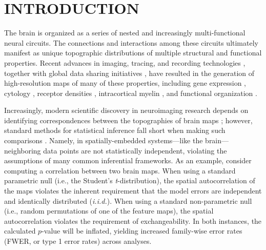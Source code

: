 \documentclass[12pt,aps,pra,reprint,showkeys]{revtex4-1}
\begin{document}
\maketitle

\section*{INTRODUCTION}

The brain is organized as a series of nested and increasingly multi-functional neural circuits.
The connections and interactions among these circuits ultimately manifest as unique topographic distributions of multiple structural and functional properties.
Recent advances in imaging, tracing, and recording technologies \citep{insel2013science}, together with global data sharing initiatives \citep{vanessen2013neuroimage, poldrack2013frontneuroinf, sudlow2015plosmed, casey2018devcogneuro}, have resulted in the generation of high-resolution maps of many of these properties, including gene expression \citep{hawrylycz2012nature, akbarian2015nature}, cytology \citep{voneconomo1925cytoarchitecture, scholtens2018neuroimage}, receptor densities \citep{beliveau2017jneuro, norgaard2020biorxiv, zilles2004janatomy, zilles2009curropneuro}, intracortical myelin \citep{burt2018natneuro, whitakervertes2016pnas}, and functional organization \citep{murray2014natneuro, yeo2011organization, shafiei2020biorxiv, margulies2016pnas, damoiseaux2006pnas, bellec2010neuroimage}.

Increasingly, modern scientific discovery in neuroimaging research depends on identifying correspondences between the topographies of brain maps \citep{baum2020pnas, vazquezrodriguez2019pnas, wang2019sciadvances, shafiei2020biorxiv, gao2020biorxiv, demirtas2019neuron, hansen2020biorxiv}; however, standard methods for statistical inference fall short when making such comparisons \citep{alexander2013convergence, alexanderbloch2018neuroimage, burt2020neuroimage, fulcher2020biorxiv}.
Namely, in spatially-embedded systems---like the brain---neighboring data points are not statistically independent, violating the assumptions of many common inferential frameworks.
As an example, consider computing a correlation between two brain maps.
When using a standard parametric null (i.e., the Student's \textit{t}-distribution), the spatial autocorrelation of the maps violates the inherent requirement that the model errors are independent and identically distributed (\textit{i.i.d.}).
When using a standard non-parametric null (i.e., random permutations of one of the feature maps), the spatial autocorrelation violates the requirement of exchangeability.
In both instances, the calculated $p$-value will be inflated, yielding increased family-wise error rates (FWER, or type 1 error rates) across analyses.
\end{document}
